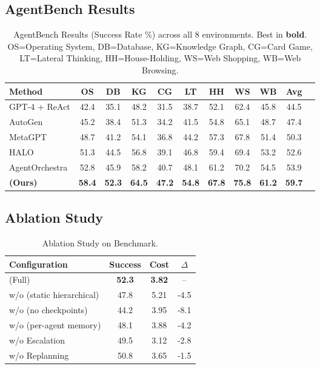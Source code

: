 \documentclass{article}
\theoremstyle{plain}
\theoremstyle{definition}
\theoremstyle{remark}
\begin{document}
\subsection{AgentBench Results}
\begin{table}[h]
	\caption{AgentBench Results (Success Rate \%) across all 8 environments. Best in \textbf{bold}. OS=Operating System, DB=Database, KG=Knowledge Graph, CG=Card Game, LT=Lateral Thinking, HH=House-Holding, WS=Web Shopping, WB=Web Browsing.}
	\label{tab:agentbench}
	\centering
	\small
	\setlength{\tabcolsep}{2.8pt}
	\begin{tabular}{@{}lcccccccccc@{}}
		\toprule
		\textbf{Method} & \textbf{OS} & \textbf{DB} & \textbf{KG} & \textbf{CG} & \textbf{LT} & \textbf{HH} & \textbf{WS} & \textbf{WB} & \textbf{Avg} \\
		\midrule
		GPT-4 + ReAct & 42.4 & 35.1 & 48.2 & 31.5 & 38.7 & 52.1 & 62.4 & 45.8 & 44.5 \\
		AutoGen & 45.2 & 38.4 & 51.3 & 34.2 & 41.5 & 54.8 & 65.1 & 48.7 & 47.4 \\
		MetaGPT & 48.7 & 41.2 & 54.1 & 36.8 & 44.2 & 57.3 & 67.8 & 51.4 & 50.3 \\
		HALO & 51.3 & 44.5 & 56.8 & 39.1 & 46.8 & 59.4 & 69.4 & 53.2 & 52.6 \\
		AgentOrchestra & 52.8 & 45.9 & 58.2 & 40.7 & 48.1 & 61.2 & 70.2 & 54.5 & 53.9 \\
		\textbf{\amore{} (Ours)} & \textbf{58.4} & \textbf{52.3} & \textbf{64.5} & \textbf{47.2} & \textbf{54.8} & \textbf{67.8} & \textbf{75.8} & \textbf{61.2} & \textbf{59.7} \\
		\bottomrule
	\end{tabular}
\end{table}

\subsection{Ablation Study}
\begin{table}[h]
	\caption{Ablation Study on \mars{} Benchmark.}
	\label{tab:ablation}
	\centering
	\small
	\begin{tabular}{@{}lccc@{}}
		\toprule
		\textbf{Configuration} & \textbf{Success} & \textbf{Cost} & \textbf{$\Delta$} \\
		\midrule
		\amore{} (Full) & \textbf{52.3} & \textbf{3.82} & -- \\
		w/o \car{} (static hierarchical) & 47.8 & 5.21 & -4.5 \\
		w/o \rcm{} (no checkpoints) & 44.2 & 3.95 & -8.1 \\
		w/o \uma{} (per-agent memory) & 48.1 & 3.88 & -4.2 \\
		w/o Escalation & 49.5 & 3.12 & -2.8 \\
		w/o Replanning & 50.8 & 3.65 & -1.5 \\
		\bottomrule
	\end{tabular}
\end{table}
\end{document}

